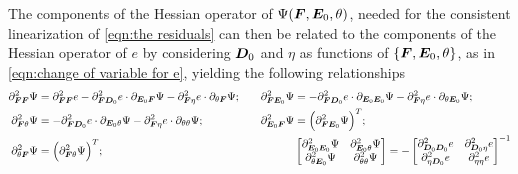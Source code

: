 The components of the Hessian operator of $\Psi(\boldsymbol{F},\boldsymbol{E}_0,\theta)$, needed for the consistent linearization of \eqref{eqn:the residuals} can then be related to the components of the Hessian operator of $e$ by considering $\boldsymbol{D}_0$ and $\eta$ as functions of $\{\boldsymbol{F},\boldsymbol{E}_0,\theta\}$, as in \eqref{eqn:change of variable for e}, yielding the following relationships
%
\begin{equation}
	\begin{aligned}
		\partial^2_{\boldsymbol{F}\boldsymbol{F}}\Psi & =  \partial^2_{\boldsymbol{F}\boldsymbol{F}}e -
		\partial^2_{\boldsymbol{F}\boldsymbol{D}_0}e \cdot \partial_{\boldsymbol{E}_0\boldsymbol{F}}\Psi 
		-
		\partial^2_{\boldsymbol{F}\eta}e \cdot \partial_{\theta\boldsymbol{F}}\Psi;&\quad
		\partial^2_{\boldsymbol{F}\boldsymbol{E}_0}\Psi & = 
			-\partial^2_{\boldsymbol{F}\boldsymbol{D}_0}e \cdot \partial_{\boldsymbol{E}_0\boldsymbol{E}_0}\Psi-\partial^2_{\boldsymbol{F}\eta}e \cdot \partial_{\theta\boldsymbol{E}_0}\Psi;\\
				\partial^2_{\boldsymbol{F}\theta}\Psi & = 
		-\partial^2_{\boldsymbol{F}\boldsymbol{D}_0}e \cdot \partial_{\boldsymbol{E}_0\theta}\Psi-\partial^2_{\boldsymbol{F}\eta}e \cdot \partial_{\theta\theta}\Psi;&\quad
		\partial^2_{\boldsymbol{E}_0\boldsymbol{F}}\Psi & =  \Big(\partial^2_{\boldsymbol{F}\boldsymbol{E}_0}\Psi\Big)^T;\\
		\partial^2_{\theta\boldsymbol{F}}\Psi & = \Big(
		\partial^2_{\boldsymbol{F}\theta}\Psi\Big)^T; &\quad
		&\begin{bmatrix}
			\partial^2_{\boldsymbol{E}_0\boldsymbol{E}_0}\Psi  &  \partial^2_{\boldsymbol{E}_0\theta}\Psi\\
			\partial^2_{\theta\boldsymbol{E}_0}\Psi  &  \partial^2_{\theta\theta}\Psi			
		\end{bmatrix}=-\begin{bmatrix}
		\partial^2_{\boldsymbol{D}_0\boldsymbol{D}_0}e  &  \partial^2_{\boldsymbol{D}_0\eta}e\\
		\partial^2_{\eta\boldsymbol{D}_0}e  &  \partial^2_{\eta\eta}e			
		\end{bmatrix}^{-1}
	\end{aligned}
\end{equation}
	



